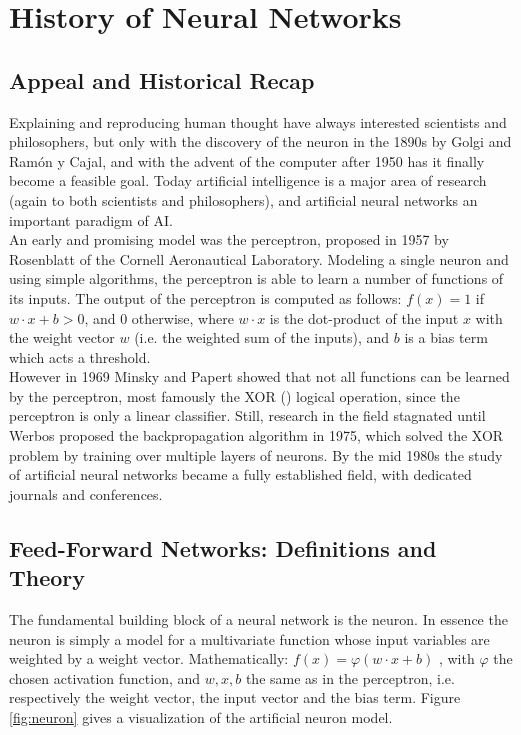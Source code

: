 \documentclass[12pt,oneside]{CUNY_CS_PhD}
\begin{document}
\tableofcontents

\mainmatter

\chapter{History of Neural Networks}
\section{Appeal and Historical Recap}
Explaining and reproducing human thought have always interested scientists and philosophers, but only with the discovery of the neuron in the 1890s by Golgi and Ram\'{o}n y Cajal, and with the advent of the computer after 1950 has it finally become a feasible goal. Today artificial intelligence is a major area of research (again to both scientists and philosophers), and artificial neural networks an important paradigm of AI.\\
An early and promising model was the perceptron, proposed in 1957 by Rosenblatt \cite{rosenblatt_perceptron_1957} of the Cornell Aeronautical Laboratory. Modeling a single neuron and using simple algorithms, the perceptron is able to learn a number of functions of its inputs. The output of the perceptron is computed as follows: $f(x) = 1$ if $w \cdot x + b>0$, and $0$ otherwise, where $w \cdot x$ is the dot-product of the input $x$ with the weight vector $w$ (i.e. the weighted sum of the inputs), and $b$ is a bias term which acts a threshold.\\
However in 1969 Minsky and Papert \cite{minsky_perceptrons_1969} showed that not all functions can be learned by the perceptron, most famously the XOR () logical operation, since the perceptron is only a linear classifier. Still, research in the field stagnated until Werbos proposed the backpropagation algorithm in 1975, which solved the XOR problem by training over multiple layers of neurons. By the mid 1980s the study of artificial neural networks became a fully established field, with dedicated journals and conferences.


\section{Feed-Forward Networks: Definitions and Theory}
The fundamental building block of a neural network is the neuron. In essence the neuron is simply a model for a multivariate function whose input variables are weighted by a weight vector. Mathematically: $f(x) = \varphi(w \cdot x +b)$ , with $\varphi$ the chosen activation function, and $w,x,b$ the same as in the perceptron, i.e. respectively the weight vector, the input vector and the bias term. Figure \ref{fig:neuron} gives a visualization of the artificial neuron model.\\
\end{document}
